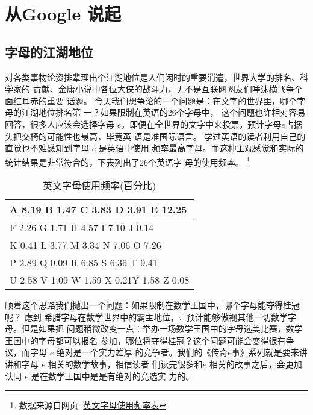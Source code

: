 %

\chapter{从Google 说起}

\section{字母的江湖地位}
对各类事物论资排辈理出个江湖地位是人们闲时的重要消遣，世界大学的排名、科学家的
贡献、金庸小说中各位大侠的战斗力，无不是互联网网友们唾沫横飞争个面红耳赤的重要
话题。 今天我们想争论的一个问题是：在文字的世界里，哪个字母的江湖地位排名第
一？如果限制在英语的26个字母中， 这个问题也许相对容易回答，很多人应该会选择字母
$e$。即便在全世界的文字中来投票，预计字母$e$占据头把交椅的可能性也最高，毕竟英
语是准国际语言。 学过英语的读者利用自己的直觉也不难感知到字母 $e$ 是英语中使用
频率最高字母。而这种主观感觉和实际的统计结果是非常符合的，下表列出了26个英语字
母的使用频率。
\footnote{
数据来源自网页: \href{http://www.zybang.com/question/26516e9f9dc704c301ad064f21265855.html}{英文字母使用频率表}
}

\begin{table}[htbp]
\centering
\caption{英文字母使用频率(百分比)}
\begin{tabular}{|l|}
\hline
A 8.19 B 1.47 C 3.83 D 3.91 E 12.25      \\ \hline
F 2.26 G 1.71 H 4.57 I 7.10 J 0.14       \\ \hline
K 0.41 L 3.77 M 3.34 N 7.06 O 7.26       \\ \hline
P 2.89 Q 0.09 R 6.85 S 6.36 T 9.41       \\ \hline
U 2.58 V 1.09 W 1.59 X 0.21Y 1.58 Z 0.08 \\ \hline
\end{tabular}
\centering
\end{table}

顺着这个思路我们抛出一个问题：如果限制在数学王国中，哪个字母能夺得桂冠呢？ 虑到
希腊字母在数学世界中的霸主地位，$\pi$ 预计能够傲视其他一切数学字母。但是如果把
问题稍微改变一点：举办一场数学王国中的字母选美比赛，数学王国中的字母都可以报名
参加，哪位将夺得桂冠？这个问题可能会变得很有争议，而字母 $e$ 绝对是一个实力雄厚
的竞争者。我们的《传奇e事》系列就是要来讲讲和字母 $e$ 相关的数学故事，相信读者
们读完很多和$e$ 相关的故事之后，会更加认同 $e$ 是在数学王国中是是有绝对的竞选实
力的。

